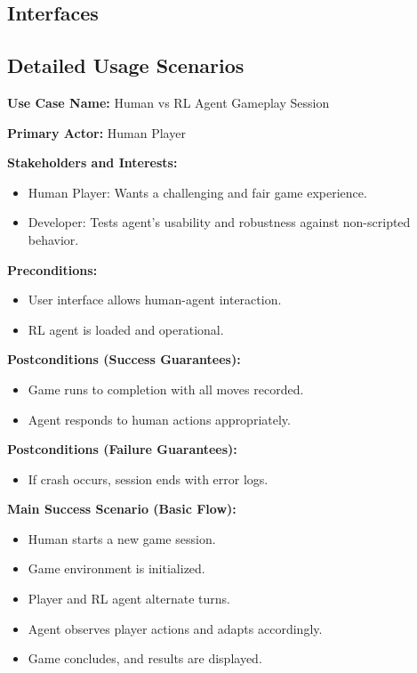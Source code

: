 \documentclass{article}
\begin{document}
\subsection{Interfaces}\label{subsec:interfaces}
\subsection{Detailed Usage Scenarios}\label{subsec:detailed-usage-scenarios}

\noindent\textbf{Use Case Name:} Human vs RL Agent Gameplay Session

\noindent\textbf{Primary Actor:} Human Player

\noindent\textbf{Stakeholders and Interests:}
\begin{itemize}
    \item Human Player: Wants a challenging and fair game experience.
    \item Developer: Tests agent's usability and robustness against non-scripted behavior.
\end{itemize}

\noindent\textbf{Preconditions:}
\begin{itemize}
    \item User interface allows human-agent interaction.
    \item RL agent is loaded and operational.
\end{itemize}

\noindent\textbf{Postconditions (Success Guarantees):}
\begin{itemize}
    \item Game runs to completion with all moves recorded.
    \item Agent responds to human actions appropriately.
\end{itemize}

\noindent\textbf{Postconditions (Failure Guarantees):}
\begin{itemize}
    \item If crash occurs, session ends with error logs.
\end{itemize}

\noindent\textbf{Main Success Scenario (Basic Flow):}
\begin{itemize}
    \item Human starts a new game session.
    \item Game environment is initialized.
    \item Player and RL agent alternate turns.
    \item Agent observes player actions and adapts accordingly.
    \item Game concludes, and results are displayed.
\end{itemize}
\end{document}
